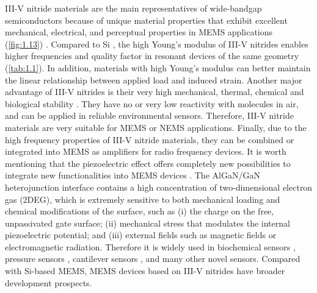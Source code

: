 III-V nitride  materials are the main representatives of wide-bandgap semiconductors because of unique material properties that exhibit excellent mechanical, electrical, and perceptual properties in  MEMS applications (\autoref{fig:1.13}) \cite{rais2014gallium,strittmatter2004development,cimalla2007group}. Compared to Si \cite{ekinci2005nanoelectromechanical}, the high Young's modulus  of III-V nitrides  enables higher frequencies and quality factor in resonant devices of the same geometry (\autoref{tab:1.1}). In addition, materials with high Young's modulus can better maintain the linear relationship between applied load and induced  strain. Another major advantage of III-V nitrides is their very high mechanical, thermal, chemical and biological stability \cite{kuball1998thermal,cimalla2007algan}. They have no or very low reactivity with molecules in air, and can be applied in reliable environmental sensors. Therefore, III-V nitride materials are very suitable for MEMS  or NEMS applications. Finally, due to the high frequency properties of III-V nitride materials, they can be combined or integrated into MEMS as amplifiers for radio frequency devices. It is worth mentioning that the piezoelectric effect  offers completely new possibilities to integrate new functionalities into MEMS devices \cite{tadigadapa2009piezoelectric}. The AlGaN/GaN heterojunction interface  contains a high concentration of two-dimensional  electron gas (2DEG), which is extremely sensitive to both mechanical loading and chemical modifications of the surface, such as (i) the charge on the free, unpassivated gate  surface; (ii) mechanical stress that modulates  the internal piezoelectric  potential; and (iii) external fields such as magnetic fields  or electromagnetic radiation. Therefore it is widely used in biochemical sensors \cite{eickhoff2003electronics,pearton2004gan,chen2008low,chang2008co,guo2012ph,kang2005electrical,kokawa2006liquid}, pressure sensors \cite{kang2005capacitance,sun2020low}, cantilever  sensors \cite{zimmermann2006piezoelectric,khmyrova2009multi,vittoz2011analytical}, and many other novel sensors. Compared with Si-based MEMS, MEMS  devices based on III-V nitrides  have broader development prospects.

